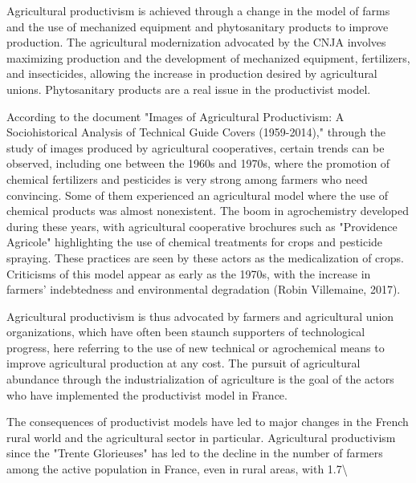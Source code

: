 \documentclass[12pt]{article}
\begin{document}
Agricultural productivism is achieved through a change in the model of farms and the use of mechanized equipment and phytosanitary products to improve production. The agricultural modernization advocated by the CNJA involves maximizing production and the development of mechanized equipment, fertilizers, and insecticides, allowing the increase in production desired by agricultural unions. Phytosanitary products are a real issue in the productivist model.

According to the document "Images of Agricultural Productivism: A Sociohistorical Analysis of Technical Guide Covers (1959-2014)," through the study of images produced by agricultural cooperatives, certain trends can be observed, including one between the 1960s and 1970s, where the promotion of chemical fertilizers and pesticides is very strong among farmers who need convincing. Some of them experienced an agricultural model where the use of chemical products was almost nonexistent. The boom in agrochemistry developed during these years, with agricultural cooperative brochures such as "Providence Agricole" highlighting the use of chemical treatments for crops and pesticide spraying. These practices are seen by these actors as the medicalization of crops. Criticisms of this model appear as early as the 1970s, with the increase in farmers' indebtedness and environmental degradation (Robin Villemaine, 2017).

Agricultural productivism is thus advocated by farmers and agricultural union organizations, which have often been staunch supporters of technological progress, here referring to the use of new technical or agrochemical means to improve agricultural production at any cost. The pursuit of agricultural abundance through the industrialization of agriculture is the goal of the actors who have implemented the productivist model in France.

The consequences of productivist models have led to major changes in the French rural world and the agricultural sector in particular. Agricultural productivism since the "Trente Glorieuses" has led to the decline in the number of farmers among the active population in France, even in rural areas, with 1.7\textbackslash{}%
\end{document}
